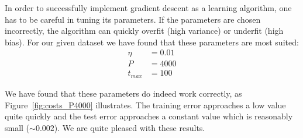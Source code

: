 In order to successfully implement gradient descent as a learning algorithm, one has to be careful in tuning its parameters. 
If the parameters are chosen incorrectly, the algorithm can quickly overfit (high variance) or underfit (high bias).
For our given dataset we have found that these parameters are most suited:
\begin{align*}
\eta &= 0.01 \\
P &= 4000 \\
t_{max} &= 100
\end{align*}

We have found that these parameters do indeed work correctly, as Figure~\ref{fig:costs_P4000} illustrates. 
The training error approaches a low value quite quickly and the test error approaches a constant value which is reasonably small (\(\sim 0.002\)).
We are quite pleased with these results.